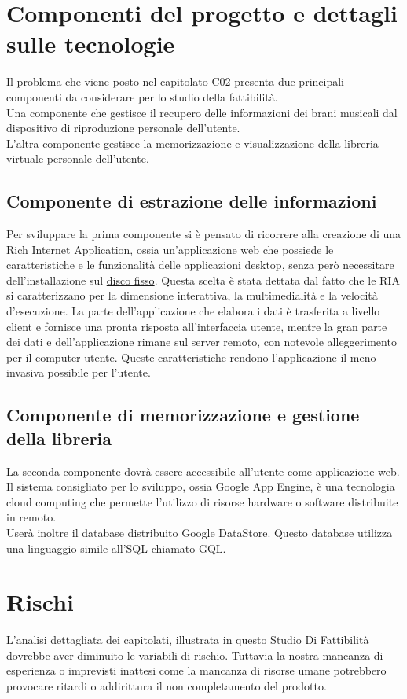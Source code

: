 \section{Componenti del progetto e dettagli sulle tecnologie}
Il problema che viene posto nel capitolato C02 presenta due principali componenti
da considerare per lo studio della fattibilit\`a.\\
Una componente che gestisce il recupero delle informazioni dei brani musicali
dal dispositivo di riproduzione personale dell'utente.\\
L'altra componente gestisce la memorizzazione e visualizzazione della libreria
virtuale personale dell'utente.

\subsection{Componente di estrazione delle informazioni}
Per sviluppare la prima componente si \`e pensato di ricorrere alla creazione di
una Rich Internet Application, ossia un'applicazione web che possiede le
caratteristiche e le funzionalit\`a delle \underline{applicazioni desktop}, senza
per\`o necessitare dell'installazione sul \underline{disco fisso}. Questa scelta
\`e stata dettata dal fatto che le RIA si caratterizzano per la dimensione
interattiva, la multimedialit\`a e la velocit\`a d'esecuzione. La parte
dell'applicazione che elabora i dati \`e trasferita a livello client e fornisce
una pronta risposta all'interfaccia utente, mentre la gran parte dei dati e
dell'applicazione rimane sul server remoto, con notevole alleggerimento per il
computer utente. Queste caratteristiche rendono l'applicazione il meno invasiva
possibile per l'utente.

\subsection{Componente di memorizzazione e gestione della libreria}
La seconda componente dovr\`a essere accessibile all'utente come
applicazione web. Il sistema consigliato per lo sviluppo, ossia Google App Engine, 
\`e una tecnologia cloud computing che permette l'utilizzo di risorse hardware o
 software distribuite in remoto.\\
 User\`a inoltre il database distribuito
 Google DataStore. Questo database utilizza una linguaggio simile
 all'\underline{SQL} chiamato \underline{GQL}.

\section{Rischi}
L'analisi dettagliata dei capitolati, illustrata in questo Studio Di
Fattibilit\`a dovrebbe aver diminuito le variabili di rischio. Tuttavia la
nostra mancanza di esperienza o imprevisti inattesi come la mancanza di
risorse umane potrebbero provocare ritardi o addirittura il non completamento
del prodotto.\\

